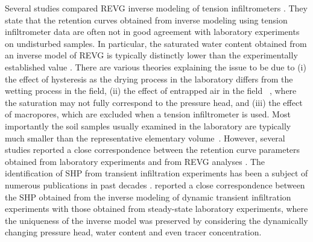 \documentclass[review]{elsarticle}
\begin{document}




Several studies compared REVG inverse modeling of tension infiltrometers \citep{Simunek1,Simunek2, Schwartz,Ventrella,Ramos, Verbist,rezaei}. They state that the retention curves obtained from inverse modeling using tension infiltrometer data are often not in good agreement with laboratory experiments on undisturbed samples. In particular, the saturated water content obtained from an inverse model of REVG is typically distinctly lower than the experimentally established value \citep{Simunek1, Verbist}. 
There are various theories explaining the issue to be due to (i) the effect of hysteresis as the drying process in the laboratory differs from the wetting process in the field, (ii) the effect of entrapped air in the field ~\citep{Fodor}, where the saturation may not fully correspond to the pressure head, and (iii) the effect of macropores, which are excluded when a tension infiltrometer is used.  Most importantly the soil samples usually examined in the laboratory are typically much smaller than the representative elementary volume~\citep{scharnagl}.
However, several studies  reported a close correspondence between the retention curve parameters obtained from laboratory experiments and from REVG analyses \citep{Ramos, Schwartz}. 
The identification of SHP from transient infiltration experiments has been a subject of numerous publications in past decades \citep{simunek-infiltr2shp, infiltr2shp, simunek2-infiltr2shp, XU201234, BAGARELLO201770,  hess-Younes-2017}.  \cite{simunek-infiltr2shp} reported a close correspondence between the SHP obtained from the inverse modeling of dynamic transient infiltration experiments with those obtained from steady-state laboratory experiments, where the uniqueness of the inverse model was preserved by considering the dynamically changing pressure head, water content and even tracer concentration.
\end{document}
